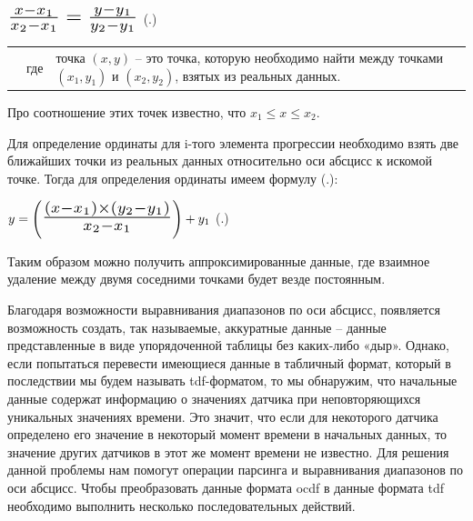 {  \formulaspace \par \redline 
    $\scaleto{\frac{x - x_1}{x_2 - x_1} = \frac{y - y_1}{y_2 - y_1}}{22pt}$
    \hfill (\thechaptercntr .\theformulacntr) \redline
  \formulaspace \addtocounter{formulacntr}{1}

  \begin{tabular}{p{}p{}p{}}
		& где  & точка $\left(x, y\right)$ {--} это точка, которую необходимо найти между точками $\left(x_1, y_1\right)$ и $\left(x_2, y_2\right)$, взятых из реальных данных. \\
  \end{tabular}

  \par \redline Про соотношение этих точек известно, что $x_1 \leq x \leq x_2$. 

  \par \redline Для определение ординаты для i-того элемента прогрессии необходимо взять две ближайших точки из реальных данных относительно оси абсцисс к искомой точке. Тогда для определения ординаты имеем формулу (\thechaptercntr .\theformulacntr):

  \formulaspace \par \redline 
    $y = \left(\scaleto{\frac{\left(x - x_1\right) \times \left(y_2 - y_1\right)}{x_2 - x_1}}{24pt}\right) + y_1$
    \hfill (\thechaptercntr .\theformulacntr) \redline
  \formulaspace \addtocounter{formulacntr}{1}

  \par \redline Таким образом можно получить аппроксимированные данные, где взаимное удаление между двумя соседними точками будет везде постоянным.  

  \par \redline Благодаря возможности выравнивания диапазонов по оси абсцисс, появляется возможность создать, так называемые, аккуратные данные – данные представленные в виде упорядоченной таблицы без каких-либо «дыр». Однако, если попытаться перевести имеющиеся данные в табличный формат, который в последствии мы будем называть tdf-форматом, то мы обнаружим, что начальные данные содержат информацию о значениях датчика при неповторяющихся уникальных значениях времени. Это значит, что если для некоторого датчика определено его значение в некоторый момент времени в начальных данных, то значение других датчиков в этот же момент времени не известно. Для решения данной проблемы нам помогут операции парсинга и выравнивания диапазонов по оси абсцисс. Чтобы преобразовать данные формата ocdf в данные формата tdf необходимо выполнить несколько последовательных действий. 

}
